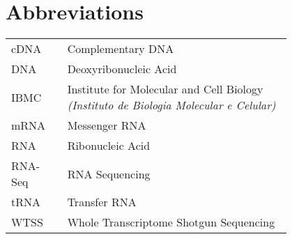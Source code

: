 \chapter*{Abbreviations}

\begin{flushleft}
\begin{tabular}{l p{0.8\linewidth}}
cDNA      & Complementary DNA\\
DNA       & Deoxyribonucleic Acid\\
IBMC      & Institute for Molecular and Cell Biology \textit{(Instituto de Biologia Molecular e Celular)}\\
mRNA      & Messenger RNA\\
RNA       & Ribonucleic Acid\\
RNA-Seq   & RNA Sequencing\\
tRNA      & Transfer RNA\\
WTSS      & Whole Transcriptome Shotgun Sequencing\\
\end{tabular}
\end{flushleft}

